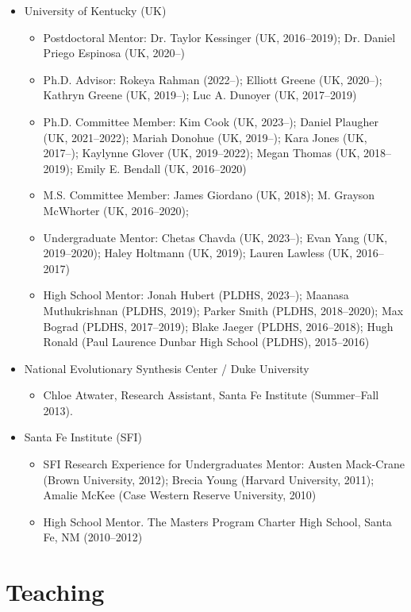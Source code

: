 \documentclass[11pt]{article}
\begin{document}
  \begin{itemize}
  \item University of Kentucky (UK)
    \begin{itemize}
    \item Postdoctoral Mentor: Dr. Taylor Kessinger (UK, 2016--2019); Dr. Daniel Priego Espinosa (UK, 2020--)
    \item Ph.D. Advisor: Rokeya Rahman (2022--); Elliott Greene (UK, 2020--); Kathryn Greene (UK, 2019--); Luc A. Dunoyer (UK, 2017--2019)
    \item Ph.D. Committee Member: Kim Cook (UK, 2023--); Daniel Plaugher (UK, 2021--2022); Mariah Donohue (UK, 2019--); Kara Jones (UK, 2017--); Kaylynne Glover (UK, 2019--2022); Megan Thomas (UK, 2018--2019); Emily E. Bendall (UK, 2016--2020)
    \item M.S. Committee Member: James Giordano (UK, 2018); M. Grayson McWhorter (UK, 2016--2020);
    \item Undergraduate Mentor: Chetas Chavda (UK, 2023--); Evan Yang (UK, 2019--2020); Haley Holtmann (UK, 2019); Lauren Lawless (UK, 2016--2017)
    \item High School Mentor: Jonah Hubert (PLDHS, 2023--); Maanasa Muthukrishnan (PLDHS, 2019); Parker Smith (PLDHS, 2018--2020); Max Bograd (PLDHS, 2017--2019); Blake Jaeger (PLDHS, 2016--2018); Hugh Ronald (Paul Laurence Dunbar High School (PLDHS), 2015--2016)
    \end{itemize}
  \item National Evolutionary Synthesis Center / Duke University
    \begin{itemize}
    \item Chloe Atwater, Research Assistant, Santa Fe Institute (Summer--Fall 2013).
    \end{itemize}
  \item Santa Fe Institute (SFI)
    \begin{itemize}
    \item SFI Research Experience for Undergraduates Mentor: Austen Mack-Crane (Brown University, 2012); Brecia Young (Harvard University, 2011); 
      Amalie McKee (Case Western Reserve University, 2010)
    \item High School Mentor. The Masters Program Charter High School, Santa Fe, NM (2010--2012)
    \end{itemize}
  \end{itemize}

  \section{Teaching}
  
\end{document}
